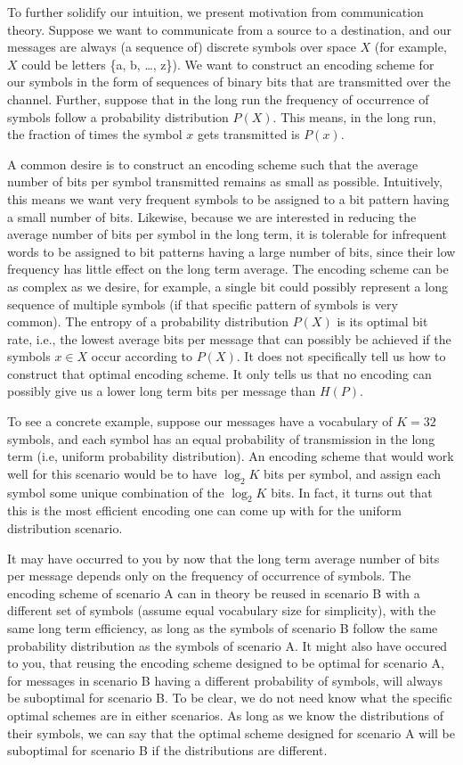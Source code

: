 \documentclass[a4paper]{article}
\begin{document}
To further solidify our intuition, we present motivation from
communication theory. Suppose we want to communicate from a
source to a destination, and our messages are always
(a sequence of) discrete symbols over space $X$
(for example, $X$ could be letters \{a, b, \dots, z\}).
We want to construct an encoding scheme for our symbols
in the form of sequences of binary bits that are transmitted
over the channel. Further, suppose that in the long run the
frequency of occurrence of symbols follow a probability
distribution $P(X)$. This means, in the long run, the fraction
of times the symbol $x$ gets transmitted is $P(x)$.

A common desire is to construct an encoding scheme such that
the average number of bits per symbol transmitted remains as
small as possible. Intuitively, this means we want very
frequent symbols to be assigned to a bit pattern having a
small number of bits. Likewise, because we are interested in
reducing the average number of bits per symbol in the long
term, it is tolerable for infrequent words to be assigned to
bit patterns having a large number of bits, since their low
frequency has little effect on the long term average. The
encoding scheme can be as complex as we desire, for example,
a single bit could possibly represent a long sequence of
multiple symbols (if that specific pattern of symbols is very
common). The entropy of a probability distribution $P(X)$ is
its optimal bit rate, i.e., the lowest average bits per
message that can possibly be achieved if the symbols $x \in X$
occur according to $P(X)$. It does not specifically tell us
how to construct that optimal encoding scheme. It only tells
us that no encoding can possibly give us a lower long term
bits per message than $H(P)$.

To see a concrete example, suppose our messages have a
vocabulary of $K = 32$ symbols, and each symbol has an equal
probability of transmission in the long term (i.e, uniform
probability distribution). An encoding scheme that would
work well for this scenario would be to have $\log_2 K$ bits
per symbol, and assign each symbol some unique combination
of the $\log_2 K$ bits. In fact, it turns out that this is the
most efficient encoding one can come up with for the uniform
distribution scenario.

It may have occurred to you by now that the long term average
number of bits per message depends only on the frequency of
occurrence of symbols. The encoding scheme of scenario A can
in theory be reused in scenario B with a different set of
symbols (assume equal vocabulary size for simplicity),
with the same long term efficiency, as long as the symbols
of scenario B follow the same probability distribution as the
symbols of scenario A. It might also have occured to you,
that reusing the encoding scheme designed to be optimal for
scenario A, for messages in scenario B having a different
probability of symbols, will always be suboptimal for
scenario B. To be clear, we do not need know what the
specific optimal schemes are in either scenarios. As long
as we know the distributions of their symbols, we can say
that the optimal scheme designed for scenario A will be
suboptimal for scenario B if the distributions are different.
\end{document}
